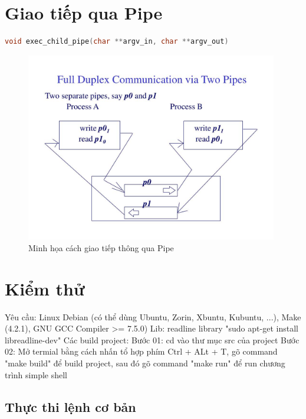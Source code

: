 \documentclass{article}
\begin{document}
\section{Giao tiếp qua Pipe}
\begin{lstlisting}[language=C]
void exec_child_pipe(char **argv_in, char **argv_out)
\end{lstlisting}

\begin{figure}[H]
\centering
\includegraphics[width=0.98\textwidth]{pipe.jpg}
\caption{Minh họa cách giao tiếp thông qua Pipe}
\end{figure}

\section{Kiểm thử}

Yêu cầu: Linux Debian (có thể dùng Ubuntu, Zorin, Xbuntu, Kubuntu, ...), Make (4.2.1), GNU GCC Compiler >= 7.5.0)\newline
Lib: readline library "sudo apt-get install libreadline-dev"\newline
Các build project:\newline
Bước 01: cd vào thư mục src của project\newline
Bước 02: Mở termial bằng cách nhấn tổ hợp phím Ctrl + ALt + T, gõ command "make build" để build project, sau đó gõ command "make run" để run chương trình simple shell\newline

\subsection{Thực thi lệnh cơ bản}
\end{document}

